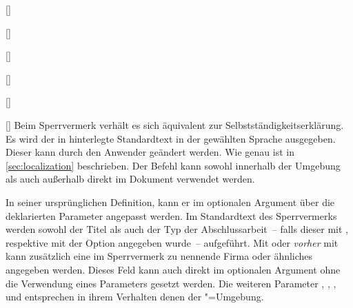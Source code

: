 \begin{Declaration*}{}
\begin{Declaration*}{}
\begin{Declaration*}{}
\begin{Declaration}[v2.02]{}
\begin{Declaration}{[]}
\begin{Declaration}{[]}
\begin{Declaration}[v2.02]{%
  []%
}
\begin{Declaration}[v2.02]{[]}
\begin{Declaration}[v2.02]{[]}
\begin{Declaration}{[\PSet]}
\printdeclarationlist%
%
Beim Sperrvermerk verhält es sich äquivalent zur Selbstständigkeitserklärung.
Es wird der in  hinterlegte Standardtext in der gewählten 
Sprache ausgegeben. Dieser kann durch den Anwender geändert werden. Wie genau 
ist in \autoref{sec:localization} beschrieben. Der Befehl  
kann sowohl innerhalb der Umgebung  als auch 
außerhalb direkt im Dokument verwendet werden. 

In seiner ursprünglichen Definition, kann er im optionalen Argument über die 
deklarierten Parameter angepasst werden. Im Standardtext des Sperrvermerks 
werden sowohl der Titel als auch der Typ der Abschlussarbeit~-- falls dieser 
mit ,  respektive  
mit der Option  angegeben wurde~-- aufgeführt. Mit 
 oder \emph{vorher} mit  kann 
zusätzlich eine im Sperrvermerk zu nennende Firma oder ähnliches angegeben 
werden. Dieses Feld kann auch direkt im optionalen Argument ohne die Verwendung 
eines Parameters gesetzt werden. Die weiteren Parameter 
, 
, 
, 
 und 
 entsprechen in ihrem Verhalten denen 
der "=Umgebung.
\end{Declaration}
\end{Declaration}
\end{Declaration}
\end{Declaration}
\end{Declaration}
\end{Declaration}
\end{Declaration}


\end{Declaration*}
\end{Declaration*}
\end{Declaration*}
